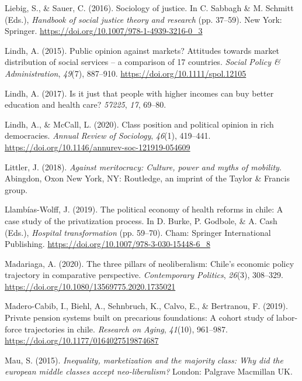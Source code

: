\documentclass[
  12pt,
]{article}
\newlength{\cslhangindent}
\newenvironment{CSLReferences}[2] %
 {\begin{list}{}{%
  \setlength{\itemindent}{0pt}
  \setlength{\leftmargin}{0pt}
  \setlength{\parsep}{0pt}
  \ifodd #1
   \setlength{\leftmargin}{\cslhangindent}
   \setlength{\itemindent}{-1\cslhangindent}
  \fi
  \setlength{\itemsep}{#2\baselineskip}}}
 {\end{list}}
\begin{document}
\begin{CSLReferences}{1}{0}
Liebig, S., \& Sauer, C. (2016). Sociology of justice. In C. Sabbagh \&
M. Schmitt (Eds.), \emph{Handbook of social justice theory and research}
(pp. 37--59). New York: Springer.
\url{https://doi.org/10.1007/978-1-4939-3216-0_3}

Lindh, A. (2015). Public opinion against markets? Attitudes towards
market distribution of social services -- a comparison of 17 countries.
\emph{Social Policy \& Administration}, \emph{49}(7), 887--910.
\url{https://doi.org/10.1111/spol.12105}

Lindh, A. (2017). Is it just that people with higher incomes can buy
better education and health care? \emph{57225}, \emph{17}, 69--80.

Lindh, A., \& McCall, L. (2020). Class position and political opinion in
rich democracies. \emph{Annual Review of Sociology}, \emph{46}(1),
419--441. \url{https://doi.org/10.1146/annurev-soc-121919-054609}

Littler, J. (2018). \emph{Against meritocracy: Culture, power and myths
of mobility}. Abingdon, Oxon New York, NY: Routledge, an imprint of the
Taylor \& Francis group.

Llambías-Wolff, J. (2019). The political economy of health reforms in
chile: A case study of the privatization process. In D. Burke, P.
Godbole, \& A. Cash (Eds.), \emph{Hospital transformation} (pp. 59--70).
Cham: Springer International Publishing.
\url{https://doi.org/10.1007/978-3-030-15448-6_8}

Madariaga, A. (2020). The three pillars of neoliberalism: Chile's
economic policy trajectory in comparative perspective.
\emph{Contemporary Politics}, \emph{26}(3), 308--329.
\url{https://doi.org/10.1080/13569775.2020.1735021}

Madero-Cabib, I., Biehl, A., Sehnbruch, K., Calvo, E., \& Bertranou, F.
(2019). Private pension systems built on precarious foundations: A
cohort study of labor-force trajectories in chile. \emph{Research on
Aging}, \emph{41}(10), 961--987.
\url{https://doi.org/10.1177/0164027519874687}

Mau, S. (2015). \emph{Inequality, marketization and the majority class:
Why did the european middle classes accept neo-liberalism?} London:
Palgrave Macmillan UK.


\end{CSLReferences}
\end{document}
